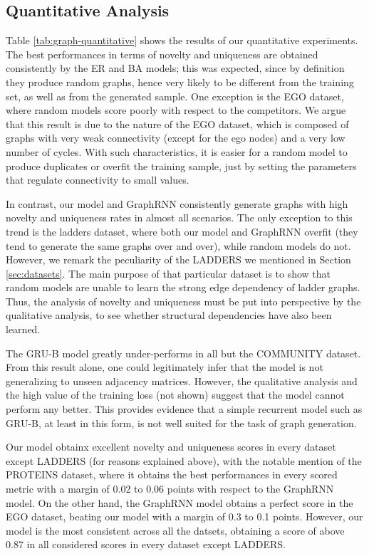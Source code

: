 \subsection{Quantitative Analysis}
Table \ref{tab:graph-quantitative} shows the results of our quantitative experiments. The best performances in terms of novelty and uniqueness are obtained consistently by the ER and BA models; this was expected, since by definition they produce random graphs, hence very likely to be different from the training set, as well as from the generated sample. One exception is the EGO dataset, where random models score poorly with respect to the competitors. We argue that this result is due to the nature of the EGO dataset, which is composed of graphs with very weak connectivity (except for the ego nodes) and a very low number of cycles. With such characteristics, it is easier for a random model to produce duplicates or overfit the training sample, just by setting the parameters that regulate connectivity to small values.

In contrast, our model and GraphRNN consistently generate graphs with high novelty and uniqueness rates in almost all scenarios. The only exception to this trend is the ladders dataset, where both our model and GraphRNN overfit (they tend to generate the same graphs over and over), while random models do not. However, we remark the peculiarity of the LADDERS we mentioned in Section \ref{sec:datasets}. The main purpose of that particular dataset is to show that random models are unable to learn the strong edge dependency of ladder graphs. Thus, the analysis of novelty and uniqueness must be put into perspective by the qualitative analysis, to see whether structural dependencies have also been learned.

The GRU-B model greatly under-performs in all but the COMMUNITY dataset. From this result alone, one could legitimately infer that the model is not generalizing to unseen adjacency matrices. However, the qualitative analysis and the high value of the training loss (not shown) suggest that the model cannot perform any better. This provides evidence that a simple recurrent model such as GRU-B, at least in this form, is not well suited for the task of graph generation.

Our model obtainx excellent novelty and uniqueness scores in every dataset except LADDERS (for reasons explained above), with the notable mention of the PROTEINS dataset, where it obtains the best performances in every scored metric with a margin of 0.02 to 0.06 points with respect to the GraphRNN model. On the other hand, the GraphRNN model obtains a perfect score in the EGO dataset, beating our model with a margin of 0.3 to 0.1 points. However, our model is the most consistent across all the datsets, obtaining a score of above 0.87 in all considered scores in every dataset except LADDERS.


